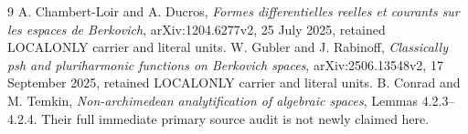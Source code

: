 \documentclass[11pt]{article}
\theoremstyle{remark}\newtheorem{remark}[theorem]{Remark}
\begin{document}
\begin{thebibliography}{9}
 A. Chambert-Loir and A. Ducros, \emph{Formes differentielles
reelles et courants sur les espaces de Berkovich}, arXiv:1204.6277v2,
25 July 2025, retained LOCALONLY carrier and literal units.
 W. Gubler and J. Rabinoff, \emph{Classically psh and
pluriharmonic functions on Berkovich spaces}, arXiv:2506.13548v2,
17 September 2025, retained LOCALONLY carrier and literal units.
 B. Conrad and M. Temkin, \emph{Non-archimedean
analytification of algebraic spaces}, Lemmas 4.2.3--4.2.4.
Their full immediate primary source audit is not newly claimed here.
\end{thebibliography}
\end{document}
